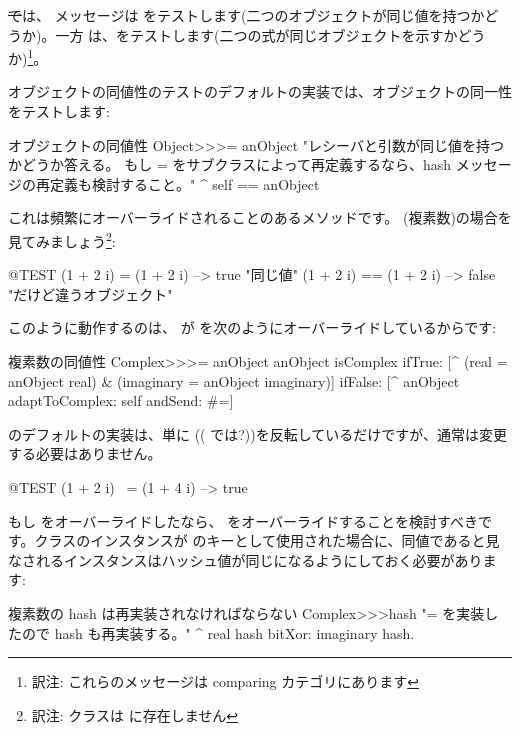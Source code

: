 \documentclass[a4paper,10pt,twoside]{book}
\begin{document}
\st では、\ct{=} メッセージは をテストします(\ie 二つのオブジェクトが同じ値を持つかどうか)。一方 \ct{==} は、をテストします(\ie 二つの式が同じオブジェクトを示すかどうか)\footnote{訳注: これらのメッセージは comparing カテゴリにあります}。

オブジェクトの同値性のテストのデフォルトの実装では、オブジェクトの同一性をテストします:
\begin{method}{オブジェクトの同値性}
Object>>>= anObject
    "レシーバと引数が同じ値を持つかどうか答える。
    もし = をサブクラスによって再定義するなら、hash メッセージの再定義も検討すること。"
    ^ self == anObject
\end{method}

これは頻繁にオーバーライドされることのあるメソッドです。 (複素数)の場合を見てみましょう\footnote{訳注:  クラスは  に存在しません}:

\begin{code}{@TEST}
(1 + 2 i) = (1 + 2 i)   --> true     "同じ値"
(1 + 2 i) == (1 + 2 i) --> false    "だけど違うオブジェクト"
\end{code}

このように動作するのは、 が \ct{=} を次のようにオーバーライドしているからです:
\begin{method}{複素数の同値性}
Complex>>>= anObject
    anObject isComplex
        ifTrue: [^ (real = anObject real) & (imaginary = anObject imaginary)]
        ifFalse: [^ anObject adaptToComplex: self andSend: #=]
\end{method}

 のデフォルトの実装は、単に  ((\ct{=} では?))を反転しているだけですが、通常は変更する必要はありません。

\begin{code}{@TEST}
(1 + 2 i) ~= (1 + 4 i) --> true
\end{code}

もし \ct{=} をオーバーライドしたなら、 をオーバーライドすることを検討すべきです。クラスのインスタンスが  のキーとして使用された場合に、同値であると見なされるインスタンスはハッシュ値が同じになるようにしておく必要があります:
\begin{method}{複素数の hash は再実装されなければならない}
Complex>>>hash
    "= を実装したので hash も再実装する。"
    ^ real hash bitXor: imaginary hash.
\end{method}
\end{document}
